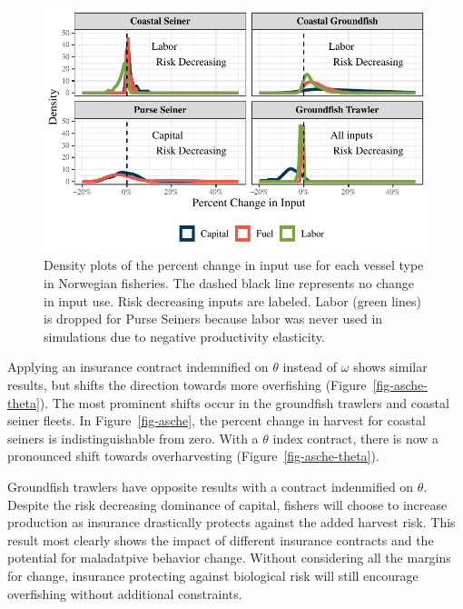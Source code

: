 \documentclass[
  letterpaper,
  DIV=11,
  numbers=noendperiod]{scrartcl}
\theoremstyle{plain}
\theoremstyle{plain}
\theoremstyle{remark}
\begin{document}
\begin{figure}

{\centering \includegraphics{ibi-behavior_files/figure-pdf/fig-asche-input-1.pdf}

}

\caption{\label{fig-asche-input}Density plots of the percent change in
input use for each vessel type in Norwegian fisheries. The dashed black
line represents no change in input use. Risk decreasing inputs are
labeled. Labor (green lines) is dropped for Purse Seiners because labor
was never used in simulations due to negative productivity elasticity.}

\end{figure}

Applying an insurance contract indemnified on \(\theta\) instead of
\(\omega\) shows similar results, but shifts the direction towards more
overfishing (Figure~\ref{fig-asche-theta}). The most prominent shifts
occur in the groundfish trawlers and coastal seiner fleets. In
Figure~\ref{fig-asche}, the percent change in harvest for coastal
seiners is indistinguishable from zero. With a \(\theta\) index
contract, there is now a pronounced shift towards overharvesting
(Figure~\ref{fig-asche-theta}).

Groundfish trawlers have opposite results with a contract indenmified on
\(\theta\). Despite the risk decreasing dominance of capital, fishers
will choose to increase production as insurance drastically protects
against the added harvest risk. This result most clearly shows the
impact of different insurance contracts and the potential for
maladatpive behavior change. Without considering all the margins for
change, insurance protecting against biological risk will still
encourage overfishing without additional constraints.
\end{document}

